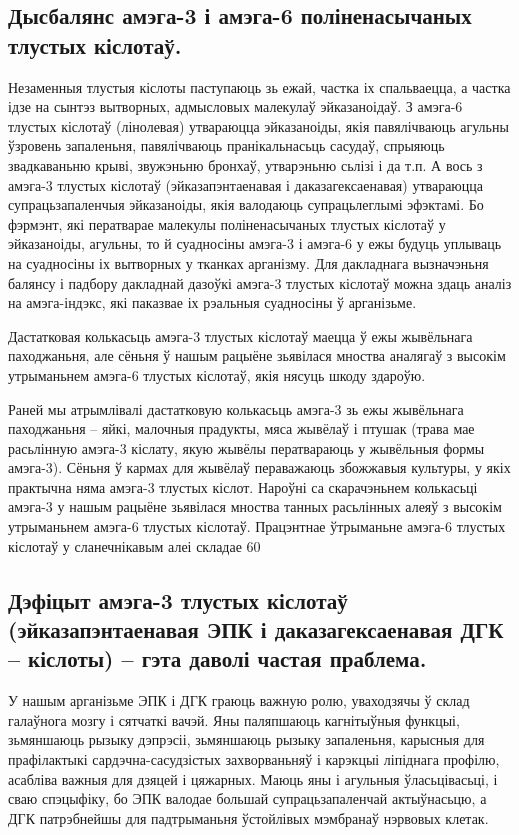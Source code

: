 \subsection{Дысбалянс амэга-3 і амэга-6 поліненасычаных тлустых кіслотаў.}
Незаменныя тлустыя кіслоты паступаюць зь ежай, частка іх спальваецца, а частка ідзе на сынтэз вытворных, адмысловых малекулаў эйказаноідаў. З амэга-6 тлустых кіслотаў (лінолевая) утвараюцца эйказаноіды, якія павялічваюць агульны ўзровень запаленьня, павялічваюць пранікальнасьць сасудаў, спрыяюць звадкаваньню крыві, звужэньню бронхаў, утварэньню сьлізі і да т.п. А вось з амэга-3 тлустых кіслотаў (эйказапэнтаенавая і даказагексаенавая) утвараюцца супрацьзапаленчыя эйказаноіды, якія валодаюць супрацьлеглымі эфэктамі. Бо фэрмэнт, які ператварае малекулы поліненасычаных тлустых кіслотаў у эйказаноіды, агульны, то й суадносіны амэга-3 і амэга-6 у ежы будуць уплываць на суадносіны іх вытворных у тканках арганізму. Для дакладнага вызначэньня балянсу і падбору дакладнай дазоўкі амэга-3 тлустых кіслотаў можна здаць аналіз на амэга-індэкс, які паказвае іх рэальныя суадносіны ў арганізьме.

Дастатковая колькасьць амэга-3 тлустых кіслотаў маецца ў ежы жывёльнага паходжаньня, але сёньня ў нашым рацыёне зьявілася мноства аналягаў з высокім утрыманьнем амэга-6 тлустых кіслотаў, якія нясуць шкоду здароўю.

Раней мы атрымлівалі дастатковую колькасьць амэга-3 зь ежы жывёльнага паходжаньня – яйкі, малочныя прадукты, мяса жывёлаў і птушак (трава мае расьлінную амэга-3 кіслату, якую жывёлы ператвараюць у жывёльныя формы амэга-3). Сёньня ў кармах для жывёлаў пераважаюць збожжавыя культуры, у якіх практычна няма амэга-3 тлустых кіслот. Нароўні са скарачэньнем колькасьці амэга-3 у нашым рацыёне зьявілася мноства танных расьлінных алеяў з высокім утрыманьнем амэга-6 тлустых кіслотаў. Працэнтнае ўтрыманьне амэга-6 тлустых кіслотаў у сланечнікавым алеі складае 60%

\subsection{Дэфіцыт амэга-3 тлустых кіслотаў (эйказапэнтаенавая ЭПК і даказагексаенавая ДГК – кіслоты) – гэта даволі частая праблема.}
У нашым арганізьме ЭПК і ДГК граюць важную ролю, уваходзячы ў склад галаўнога мозгу і сятчаткі вачэй. Яны паляпшаюць кагнітыўныя функцыі, зьмяншаюць рызыку дэпрэсіі, зьмяншаюць рызыку запаленьня, карысныя для прафілактыкі сардэчна-сасудзістых захворваньняў і карэкцыі ліпіднага профілю, асабліва важныя для дзяцей і цяжарных. Маюць яны і агульныя ўласьцівасьці, і сваю спэцыфіку, бо ЭПК валодае большай супрацьзапаленчай актыўнасьцю, а ДГК патрэбнейшы для падтрыманьня ўстойлівых мэмбранаў нэрвовых клетак.

